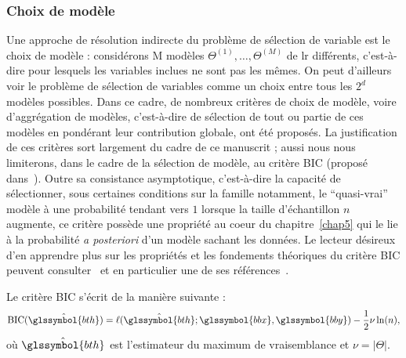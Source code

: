 \subsubsection{Choix de modèle} \label{subsubsec:choix_modele}

Une approche de résolution indirecte du problème de sélection de variable est le choix de modèle : considérons M modèles $\Theta^{(1)},\dots,\Theta^{(M)}$ de \gls{lr} différents, c'est-à-dire pour lesquels les variables inclues ne sont pas les mêmes. On peut d'ailleurs voir le problème de sélection de variables comme un choix entre tous les $2^d$ modèles possibles. Dans ce cadre, de nombreux critères de choix de modèle, voire d'aggrégation de modèles, c'est-à-dire de sélection de tout ou partie de ces modèles en pondérant leur contribution globale, ont été proposés. La justification de ces critères sort largement du cadre de ce manuscrit ; aussi nous nous limiterons, dans le cadre de la sélection de modèle, au critère BIC (proposé dans~\cite{BIC}). Outre sa consistance asymptotique, c'est-à-dire la capacité de sélectionner, sous certaines conditions sur la famille notamment, le ``quasi-vrai'' modèle à une probabilité tendant vers $1$ lorsque la taille d'échantillon $n$ augmente, ce critère possède une propriété au coeur du chapitre~\ref{chap5} qui le lie à la probabilité \textit{a posteriori} d'un modèle sachant les données. Le lecteur désireux d'en apprendre plus sur les propriétés et les fondements théoriques du critère BIC peuvent consulter~\cite{lebarbier} et en particulier une de ses références~\cite{burnham2003model}.

Le critère BIC s'écrit de la manière suivante :
\begin{equation}
    \label{eq:BIC}
    \text{BIC}(\hat{\glssymbol{bth}}) =  \ell(\hat{\glssymbol{bth}} ; \glssymbol{bbx},\glssymbol{bby}) - \frac12 \nu \ln (n),
\end{equation}
où $\hat{\glssymbol{bth}}$ est l'estimateur du maximum de vraisemblance et $\nu = |\Theta|$.


%
%
%
%
%


